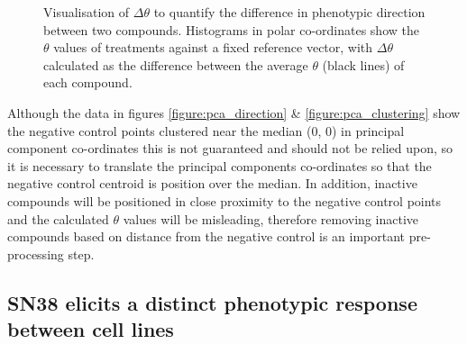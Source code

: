 \documentclass[a4paper,11pt,twoside,openright]{scrbook}
\begin{document}
\begin{figure}
    \captionsetup{width=0.8\textwidth}
    \caption[Visualisation of $\Delta\theta$ to quantify the difference in phenotypic direction between two compounds.]{
Visualisation of $\Delta\theta$ to quantify the difference in phenotypic direction between two compounds.
Histograms in polar co-ordinates show the $\theta$ values of treatments against a fixed reference vector, with 
$\Delta\theta$ calculated as the difference between the average $\theta$ (black lines) of each compound.
}
    
    \label{figure:theta_histogram}
\end{figure}

Although the data in figures \ref{figure:pca_direction} \& \ref{figure:pca_clustering} show the negative control points 
clustered near the median (0, 0) in principal component co-ordinates this is not guaranteed and should not be relied 
upon, so it is necessary to translate the principal components co-ordinates so that the negative control centroid is 
position over the median.
In addition, inactive compounds will be positioned in close proximity to the negative control points and the calculated 
$\theta$ values will be misleading, therefore removing inactive compounds based on distance from the negative control 
is an important pre-processing step.


\subsection{SN38 elicits a distinct phenotypic response between cell lines}
\end{document}
